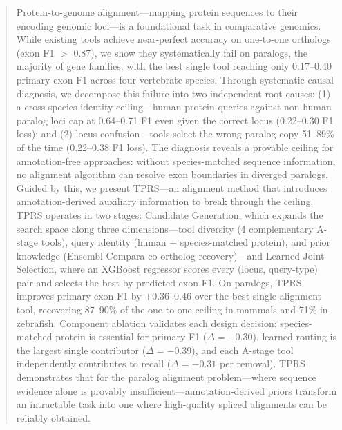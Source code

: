\begin{abstract}
Protein-to-genome alignment---mapping protein sequences to their encoding genomic loci---is a foundational task in comparative genomics. While existing tools achieve near-perfect accuracy on one-to-one orthologs (exon F1 $>$ 0.87), we show they systematically fail on paralogs, the majority of gene families, with the best single tool reaching only 0.17--0.40 primary exon F1 across four vertebrate species. Through systematic causal diagnosis, we decompose this failure into two independent root causes: (1) a cross-species identity ceiling---human protein queries against non-human paralog loci cap at 0.64--0.71 F1 even given the correct locus (0.22--0.30 F1 loss); and (2) locus confusion---tools select the wrong paralog copy 51--89\% of the time (0.22--0.38 F1 loss). The diagnosis reveals a provable ceiling for annotation-free approaches: without species-matched sequence information, no alignment algorithm can resolve exon boundaries in diverged paralogs. Guided by this, we present TPRS---an alignment method that introduces annotation-derived auxiliary information to break through the ceiling. TPRS operates in two stages: Candidate Generation, which expands the search space along three dimensions---tool diversity (4 complementary A-stage tools), query identity (human + species-matched protein), and prior knowledge (Ensembl Compara co-ortholog recovery)---and Learned Joint Selection, where an XGBoost regressor scores every (locus, query-type) pair and selects the best by predicted exon F1. On paralogs, TPRS improves primary exon F1 by $+$0.36--0.46 over the best single alignment tool, recovering 87--90\% of the one-to-one ceiling in mammals and 71\% in zebrafish. Component ablation validates each design decision: species-matched protein is essential for primary F1 ($\Delta = -0.30$), learned routing is the largest single contributor ($\Delta = -0.39$), and each A-stage tool independently contributes to recall ($\Delta = -0.31$ per removal). TPRS demonstrates that for the paralog alignment problem---where sequence evidence alone is provably insufficient---annotation-derived priors transform an intractable task into one where high-quality spliced alignments can be reliably obtained.
\end{abstract}
